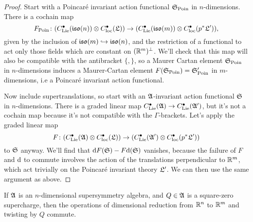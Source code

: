 \documentclass[10pt, oneside]{article}
\begin{document}
\begin{proof}
  Start with a Poincar\'e invariant action functional $\mathfrak{S}_{\mathrm{Poin}}$ in $n$-dimensions.  There is a cochain map \[F_{\mathrm{Poin}} \colon (C^\bullet_{\mathrm{Lie}}(\mathfrak{iso}(n)) \otimes C^\bullet_{\mathrm{loc}}(\mathfrak{L}))\to (C^\bullet_{\mathrm{Lie}}(\mathfrak{iso}(m)) \otimes C^\bullet_{\mathrm{loc}}(p^* \mathfrak{L}')),\] 
 given by the inclusion of $\mathfrak{iso}(m) \hookrightarrow \mathfrak{iso}(n)$, and the restriction of a functional to act only those fields which are constant on $(\mathbb R^m)^\perp$.   We'll check that this map will also be compatible with the antibracket $\{,\}$, so a Maurer Cartan element $\mathfrak{S}_{\mathrm{Poin}}$ in $n$-dimensions induces a Maurer-Cartan element $F(\mathfrak{S}_{\mathrm{Poin}}) = \mathfrak{S}'_{\mathrm{Poin}}$ in $m$-dimensions, i.e a Poincar\'e invariant action functional. 
 
 Now include supertranslations, so start with an $\mathfrak{A}$-invariant action functional $\mathfrak{S}$ in $n$-dimensions.  There is a graded linear map $C^\bullet_{\mathrm{Lie}}(\mathfrak{A}) \to C^\bullet_{\mathrm{Lie}}(\mathfrak{A}')$, but it's not a cochain map because it's not compatible with the $\Gamma$-brackets.  Let's apply the graded linear map \[F \colon (C^\bullet_{\mathrm{Lie}}(\mathfrak{A}) \otimes C^\bullet_{\mathrm{loc}}(\mathfrak{L}))\to (C^\bullet_{\mathrm{Lie}}(\mathfrak{A}') \otimes C^\bullet_{\mathrm{loc}}(p^*\mathfrak{L}'))\] to $\mathfrak{S}$ anyway.  We'll find that ${\rm d} F(\mathfrak{S}) - F {\rm d}(\mathfrak{S})$ vanishes, because the failure of $F$ and ${\rm d}$ to commute involves the action of the translations perpendicular to $\mathbb R^m$, which act trivially on the Poincar\'e invariant theory $\mathfrak{L}'$.  We can then use the same argument as above. 
\end{proof}


\begin{lemma} \label{commuting_twist_and_reduction_lemma}
If $\mathfrak{A}$ is an $n$-dimensional supersymmetry algebra, and $Q \in \mathfrak{A}$ is a square-zero supercharge, then the operations of dimensional reduction from $\mathbb R^n$ to $\mathbb R^m$ and twisting by $Q$ commute.
\end{lemma}
\end{document}

